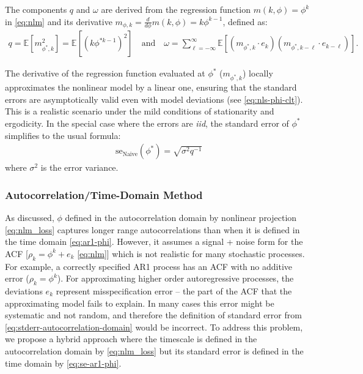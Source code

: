 \documentclass[main.tex]{subfiles}
\begin{document}
\noindent The components $q$ and $\omega$ are derived from the regression function $m(k, \phi) = \phi^k$ in \eqref{eq:nlm} and its derivative $m_{\phi, k} = \frac{d}{d\phi} m(k, \phi) = k \phi^{k-1}$, defined as:
\begin{align}
    q = \mathbb{E}[m_{\phi^*, k}^2] = \mathbb{E}[(k \phi^{*k-1})^2] \quad\text{and}\quad
    \omega = \sum_{\ell=-\infty}^{\infty} \mathbb{E}[(m_{\phi^*, k} \cdot e_{k})(m_{\phi^*, k-\ell} \cdot e_{k-\ell})].
\end{align}

\noindent The derivative of the regression function evaluated at $\phi^*$ ($m_{\phi^*, k}$) locally approximates the nonlinear model by a linear one, ensuring that the standard errors are asymptotically valid even with model deviations (see \eqref{eq:nls-phi-clt}). This is a realistic scenario under the mild conditions of stationarity and ergodicity. In the special case where the errors are \textit{iid}, the standard error of $\phi^*$ simplifies to the usual formula:
\begin{align}
    \text{se}_{\text{Naive}}(\phi^*) = \sqrt{\sigma^2 q^{-1}}
\end{align}
\noindent where $\sigma^2$ is the error variance.

\subsubsection{Autocorrelation/Time-Domain Method}

As discussed, $\phi$ defined in the autocorrelation domain by nonlinear projection \eqref{eq:nlm_loss} captures longer range autocorrelations than when it is defined in the time domain \eqref{eq:ar1-phi}. However, it assumes a signal + noise form for the ACF [$\rho_k = \phi^k + e_k$ \eqref{eq:nlm}] which is not realistic for many stochastic processes. For example, a correctly specified AR1 process has an ACF with no additive error ($\rho_k=\phi^k$). For approximating higher order autoregressive processes, the deviations $e_k$ represent misspecification error -- the part of the ACF that the approximating model fails to explain. In many cases this error might be systematic and not random, and therefore the definition of standard error from \eqref{eq:stderr-autocorrelation-domain} would be incorrect. To address this problem, we propose a hybrid approach where the timescale is defined in the autocorrelation domain by \eqref{eq:nlm_loss} but its standard error is defined in the time domain by \eqref{eq:se-ar1-phi}.
\end{document}
